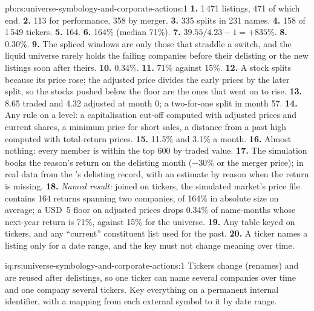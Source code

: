 \begin{solution}{pb:rs:universe-symbology-and-corporate-actions:1}
\textbf{1.} 1\,471 listings, 471 of which end. \textbf{2.} 113 for performance, 358 by merger. \textbf{3.} 335 splits in 231 names.
\textbf{4.} 158 of 1\,549 tickers. \textbf{5.} 164. \textbf{6.} 164\% (median 71\%). \textbf{7.} $39.55/4.23 - 1 = +835\%$.
\textbf{8.} 0.30\%. \textbf{9.} The spliced windows are only those that straddle a switch, and the liquid universe rarely holds the
failing companies before their delisting or the new listings soon after theirs. \textbf{10.} 0.34\%. \textbf{11.} 71\% against
15\%. \textbf{12.} A stock splits because its price rose; the adjusted price divides the early prices by the later split, so the
stocks pushed below the floor are the ones that went on to rise. \textbf{13.} 8.65 traded and 4.32 adjusted at month 0; a two-for-one
split in month 57. \textbf{14.} Any rule on a level: a capitalisation cut-off computed with adjusted prices and current shares, a
minimum price for short sales, a distance from a past high computed with total-return prices. \textbf{15.} 11.5\% and 3.1\% a month.
\textbf{16.} Almost nothing: every member is within the top 600 by traded value. \textbf{17.} The simulation books the reason's
return on the delisting month ($-30\%$ or the merger price); in real data from the 's delisting record, with an
estimate by reason when the return is missing. \textbf{18.} \emph{Named result:} joined on tickers, the simulated market's price file
contains 164 returns spanning two companies, of 164\% in absolute size on average; a USD~5 floor on adjusted prices drops 0.34\% of
name-months whose next-year return is 71\%, against 15\% for the universe. \textbf{19.} Any table keyed on tickers, and any
``current'' constituent list used for the past. \textbf{20.} A ticker names a listing only for a date range, and the key must not
change meaning over time.
\end{solution}

\begin{solution}{iq:rs:universe-symbology-and-corporate-actions:1}
Tickers change (renames) and are reused after delistings, so one ticker can name several companies over time and one company
several tickers. Key everything on a permanent internal identifier, with a mapping from each external symbol to it by date range.
\end{solution}

